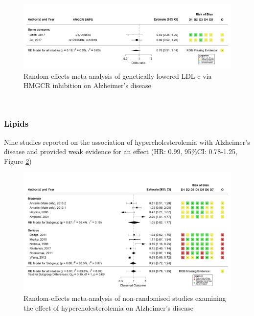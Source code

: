 \documentclass[a4paper, twoside]{templates/ociamthesis}
\begin{document}
\begin{figure}[H]
\includegraphics[width=1\linewidth]{figures/sys-rev/fp_MR_HMGCR_AD} \caption[Random-effects meta-analysis of genetically lowered LDL-c via HMGCR inhibition on Alzheimer's disease]{Random-effects meta-analysis of genetically lowered LDL-c via HMGCR inhibition on Alzheimer's disease}\label{fig:mrStatinADFig}
\end{figure}

~

\hypertarget{lipids-1}{%
\subsubsection{Lipids}\label{lipids-1}}

Nine studies reported on the association of hypercholesterolemia with Alzheimer's disease and provided weak evidence for an effect (HR: 0.99, 95\%CI: 0.78-1.25, Figure \ref{fig:obsHyperAD})





\begin{figure}[H]
\includegraphics[width=1\linewidth]{figures/sys-rev/fp_obs_hyperchol_AD} \caption[Meta-analysis of hypercholesterolemia on Alzheimer's disease]{Random-effects meta-analysis of non-randomised studies examining the effect of hypercholesterolemia on Alzheimer's disease}\label{fig:obsHyperAD}
\end{figure}
\end{document}
